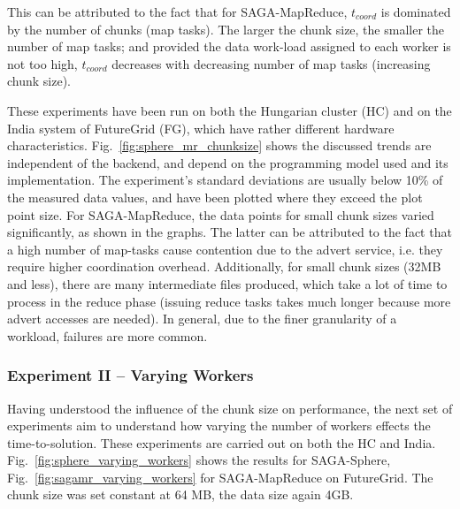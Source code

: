 \documentclass[3p,twocolumn]{elsarticle}
\begin{document}
This can be attributed to the fact that for SAGA-MapReduce,
$t_{coord}$ is dominated by the number of chunks (map tasks).
The larger the chunk size, the smaller the number
of map tasks; and provided the data work-load assigned to each worker
is not too high, $t_{coord}$ decreases with decreasing number of map
tasks (increasing chunk size).

These experiments have been run on both the Hungarian cluster (HC) and
on the India system of FutureGrid (FG), which have rather different
hardware characteristics.  Fig.~\ref{fig:sphere_mr_chunksize} shows
the discussed trends are independent of the backend, and depend on the
programming model used and its implementation. The experiment's
standard deviations are usually below 10\% of the measured data
values, and have been plotted where they exceed the plot point size.
For SAGA-MapReduce, the data points for small chunk sizes varied
significantly, as shown in the graphs.  The latter can be attributed
to the fact that a high number of map-tasks cause contention due to
the advert service, i.e. they require higher coordination overhead.
Additionally, for small chunk sizes (32MB and less), there are many
intermediate files produced, which take a lot of time to process in
the reduce phase (issuing reduce tasks takes much longer because more
advert accesses are needed).  In general, due to the finer granularity
of a workload, failures are more common.



\subsubsection{Experiment II -- Varying Workers}

Having understood the influence of the chunk size on performance, the
next set of experiments aim to understand how varying the number of
workers effects the time-to-solution. These experiments are carried
out on both the HC and India.  Fig.~\ref{fig:sphere_varying_workers}
shows the results for SAGA-Sphere,
Fig.~\ref{fig:sagamr_varying_workers} for SAGA-MapReduce on
FutureGrid. The chunk size was set constant at 64 MB, the data size
again 4GB.
\end{document}
